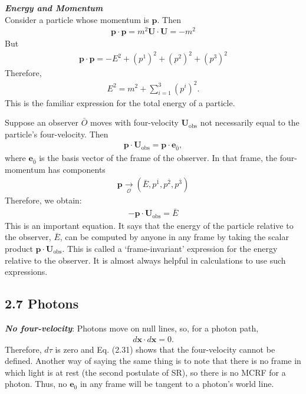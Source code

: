 \documentclass[12pt]{book}
\begin{document}
    \textit{\textbf{Energy and Momentum}}\\
        Consider a particle whose momentum is \( \mathbf{p} \). Then
        \begin{align}
        \mathbf{p} \cdot \mathbf{p} = m^2 \mathbf{U} \cdot \mathbf{U} = -m^2
        \end{align}
        But
        \begin{align}
        \mathbf{p} \cdot \mathbf{p} = -E^2 + (p^1)^2 + (p^2)^2 + (p^3)^2
        \end{align}
        Therefore,
        \begin{align}
        E^2 = m^2 + \sum_{i=1}^{3} (p^i)^2.
        \end{align}
        This is the familiar expression for the total energy of a particle.
        
        Suppose an observer \( \bar{O} \) moves with four-velocity \( \mathbf{U}_{\text{obs}} \) not necessarily equal to the particle’s four-velocity. Then
        \begin{align}
        \mathbf{p} \cdot \mathbf{U}_{\text{obs}} = \mathbf{p} \cdot \mathbf{e}_{\bar{0}},
        \end{align}
        where \( \mathbf{e}_{\bar{0}} \) is the basis vector of the frame of the observer. In that frame, the four-momentum has components
        \begin{align}
        \mathbf{p} \underset{\mathcal{O}}{\rightarrow} (\bar{E}, p^{\bar{1}}, p^{\bar{2}}, p^{\bar{3}})
        \end{align}
        Therefore, we obtain:
        \begin{align}
        - \mathbf{p} \cdot \mathbf{U}_{\text{obs}} = \bar{E}
        \end{align}
        This is an important equation. It says that the energy of the particle relative to the observer, \( \bar{E} \), can be computed by anyone in any frame by taking the scalar product \( \mathbf{p} \cdot \mathbf{U}_{\text{obs}} \). This is called a ‘frame-invariant’ expression for the energy relative to the observer. It is almost always helpful in calculations to use such expressions.\\

    \subsection{2.7 Photons }

        \textit{\textbf{No four-velocity}}: Photons move on null lines, so, for a photon path,
        \begin{align}
        d\mathbf{x} \cdot d\mathbf{x} = 0.
        \end{align}
        Therefore, \( d\tau \) is zero and Eq. (2.31) shows that the four-velocity cannot be defined. Another way of saying the same thing is to note that there is no frame in which light is at rest (the second postulate of SR), so there is no MCRF for a photon. Thus, no \( \mathbf{e}_0 \) in any frame will be tangent to a photon’s world line.
        
\end{document}
